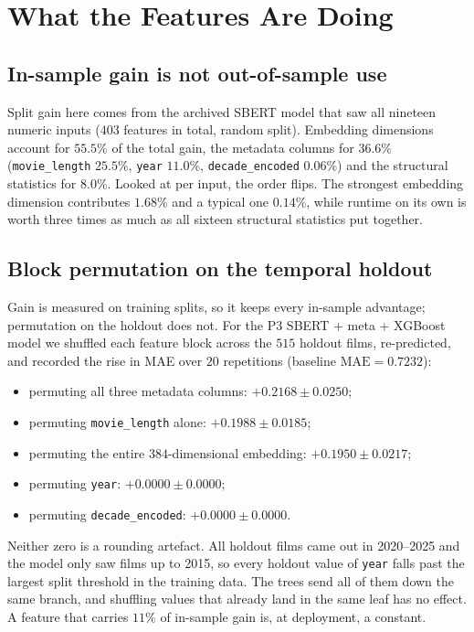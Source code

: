 \documentclass[conference,a4paper]{IEEEtran}
\begin{document}
\section{What the Features Are Doing}
\label{sec:xai}

\subsection{In-sample gain is not out-of-sample use}

Split gain here comes from the archived SBERT model that saw all
nineteen numeric inputs ($403$ features in total, random split).
Embedding dimensions account for $55.5\%$ of the total gain, the metadata
columns for $36.6\%$ (\texttt{movie\_length} $25.5\%$, \texttt{year}
$11.0\%$, \texttt{decade\_encoded} $0.06\%$) and the structural
statistics for $8.0\%$. Looked at per input, the order flips. The
strongest embedding dimension contributes $1.68\%$ and a typical one
$0.14\%$, while runtime on its own is worth three times as much as all
sixteen structural statistics put together.

\subsection{Block permutation on the temporal holdout}

Gain is measured on training splits, so it keeps every in-sample
advantage; permutation on the holdout does not. For the P3 SBERT + meta
+ XGBoost model we shuffled each feature block across the $515$ holdout
films, re-predicted, and recorded the rise in MAE over $20$ repetitions
(baseline $\mathrm{MAE} = 0.7232$):
\begin{itemize}
\item permuting all three metadata columns: $+0.2168 \pm 0.0250$;
\item permuting \texttt{movie\_length} alone: $+0.1988 \pm 0.0185$;
\item permuting the entire $384$-dimensional embedding:
      $+0.1950 \pm 0.0217$;
\item permuting \texttt{year}: $+0.0000 \pm 0.0000$;
\item permuting \texttt{decade\_encoded}: $+0.0000 \pm 0.0000$.
\end{itemize}

Neither zero is a rounding artefact. All holdout films came out in
2020--2025 and the model only saw films up to 2015, so every holdout
value of \texttt{year} falls past the largest split threshold in the
training data. The trees send all of them down the same branch, and
shuffling values that already land in the same leaf has no effect. A
feature that carries $11\%$ of in-sample gain is, at deployment, a
constant.
\end{document}

